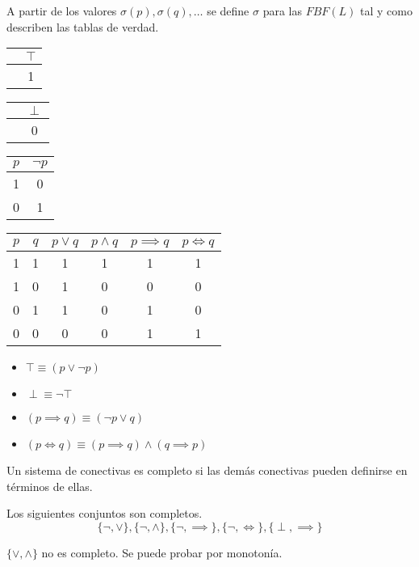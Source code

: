 A partir de los valores $\sigma(p), \sigma(q),\hdots$ se define $\sigma$ para las $FBF(L)$ tal y como describen las tablas de verdad.
\begin{center}
\begin{tabular}{c|c}
	& $\top$\\
	\hline
	& 1 \\
\end{tabular}\hspace{1cm}
\begin{tabular}{c|c}
	& $\perp$\\
	\hline
	& 0 \\
\end{tabular}\hspace{1cm}
\begin{tabular}{|c|c|}
	\hline
	$p$ & $\neg p$\\
	\hline
	1 & 0 \\
	\hline
	0 & 1\\
	\hline
\end{tabular}

\begin{tabular}{|c|c|c|c|c|c|}
	\hline
	$p$ & $q$ & $p\vee q$ & $p \wedge q$ & $p\implies q$ &  $p\iff q$\\
	\hline
	1 & 1 & 1 & 1 & 1 & 1 \\
	\hline
	1 & 0 & 1 & 0 & 0 & 0 \\
	\hline
	0 & 1 & 1 & 0 & 1 & 0 \\
	\hline
	0 & 0 & 0 & 0 & 1 & 1 \\
	\hline
\end{tabular}
\end{center}

\begin{obs}
	\begin{itemize}
	\item $\top \equiv (p\vee \neg p)$
	\item $\perp \equiv \neg \top $
	\item $(p\implies q) \equiv (\neg p \vee q)$
	\item $(p\iff q) \equiv (p\implies q)\wedge (q \implies p)$
	\end{itemize}
\end{obs}

\begin{defn}
	Un sistema de conectivas es completo si las demás conectivas pueden definirse en términos de ellas.
\end{defn}

\begin{example}
	Los siguientes conjuntos son completos.
	$$\{\neg, \vee\}, \{\neg, \wedge\}, \{\neg, \implies\}, \{\neg, \iff\}, \{\perp, \implies\}$$

	$\{\vee,\wedge\}$ no es completo. Se puede probar por monotonía.
\end{example}

